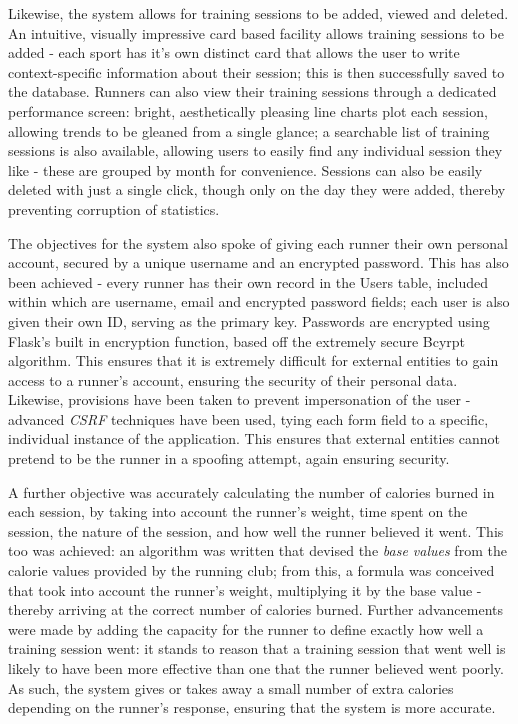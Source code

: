 \documentclass{article}[12pt,a4paper]
\begin{document}
{Likewise, the system allows for training sessions to be added, viewed and deleted. An intuitive, visually impressive card based facility allows training sessions to be added - each sport has it's own distinct card that allows the user to write context-specific information about their session; this is then successfully saved to the database. Runners can also view their training sessions through a dedicated performance screen: bright, aesthetically pleasing line charts plot each session, allowing trends to be gleaned from a single glance; a searchable list of training sessions is also available, allowing users to easily find any individual session they like - these are grouped by month for convenience. Sessions can also be easily deleted with just a single click, though only on the day they were added, thereby preventing corruption of statistics.

The objectives for the system also spoke of giving each runner their own personal account, secured by a unique username and an encrypted password. This has also been achieved - every runner has their own record in the Users table, included within which are username, email and encrypted password fields; each user is also given their own ID, serving as the primary key. Passwords are encrypted using Flask's built in encryption function, based off the extremely secure Bcyrpt algorithm. This ensures that it is extremely difficult for external entities to gain access to a runner's account, ensuring the security of their personal data. Likewise, provisions have been taken to prevent impersonation of the user - advanced \textit{CSRF} techniques have been used, tying each form field to a specific, individual instance of the application. This ensures that external entities cannot pretend to be the runner in a spoofing attempt, again ensuring security.

A further objective was accurately calculating the number of calories burned in each session, by taking into account the runner’s weight, time spent on the session, the nature of the session, and how well the runner believed it went. This too was achieved: an algorithm was written that devised the \textit{base values} from the calorie values provided by the running club; from this, a formula was conceived that took into account the runner's weight, multiplying it by the base value - thereby arriving at the correct number of calories burned. Further advancements were made by adding the capacity for the runner to define exactly how well a training session went: it stands to reason that a training session that went well is likely to have been more effective than one that the runner believed went poorly. As such, the system gives or takes away a small number of extra calories depending on the runner's response, ensuring that the system is more accurate.

}
\end{document}
